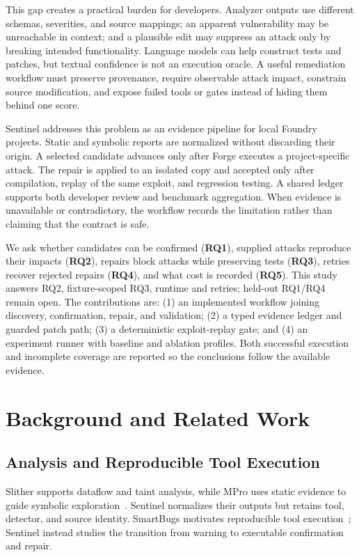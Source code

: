 \documentclass[conference,a4paper,10pt]{IEEEtran}
\begin{document}
This gap creates a practical burden for developers. Analyzer outputs use different schemas, severities, and source mappings; an apparent vulnerability may be unreachable in context; and a plausible edit may suppress an attack only by breaking intended functionality. Language models can help construct tests and patches, but textual confidence is not an execution oracle. A useful remediation workflow must preserve provenance, require observable attack impact, constrain source modification, and expose failed tools or gates instead of hiding them behind one score.

Sentinel addresses this problem as an evidence pipeline for local Foundry projects. Static and symbolic reports are normalized without discarding their origin. A selected candidate advances only after Forge executes a project-specific attack. The repair is applied to an isolated copy and accepted only after compilation, replay of the same exploit, and regression testing. A shared ledger supports both developer review and benchmark aggregation. When evidence is unavailable or contradictory, the workflow records the limitation rather than claiming that the contract is safe.

We ask whether candidates can be confirmed (\textbf{RQ1}), supplied attacks reproduce their impacts (\textbf{RQ2}), repairs block attacks while preserving tests (\textbf{RQ3}), retries recover rejected repairs (\textbf{RQ4}), and what cost is recorded (\textbf{RQ5}). This study answers RQ2, fixture-scoped RQ3, runtime and retries; held-out RQ1/RQ4 remain open. The contributions are: (1) an implemented workflow joining discovery, confirmation, repair, and validation; (2) a typed evidence ledger and guarded patch path; (3) a deterministic exploit-replay gate; and (4) an experiment runner with baseline and ablation profiles. Both successful execution and incomplete coverage are reported so the conclusions follow the available evidence.

\section{Background and Related Work}
\subsection{Analysis and Reproducible Tool Execution}
Slither supports dataflow and taint analysis, while MPro uses static evidence to guide symbolic exploration~\cite{slither,mpro}. Sentinel normalizes their outputs but retains tool, detector, and source identity. SmartBugs motivates reproducible tool execution~\cite{smartbugs}; Sentinel instead studies the transition from warning to executable confirmation and repair.
\end{document}

